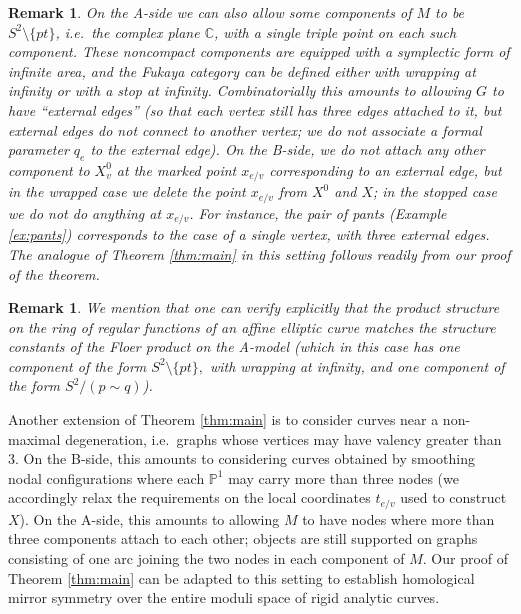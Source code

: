 \documentclass[11pt,leqno]{amsart}
\newtheorem{remark}[theo]{Remark}
\numberwithin{equation}{section}
\def\C{\mathbb{C}}
\def\PP{{\mathbb P}}
\begin{document}
\begin{remark}\label{rmk:opencase}
On the A-side we can also allow some components of $M$ to be $S^2\setminus
\{pt\}$, i.e.\ the complex plane $\C$, with a single triple point on each
such component. These noncompact components are equipped with a symplectic 
form of infinite area, and the Fukaya category can be defined either with wrapping at infinity or with a stop at infinity.
Combinatorially this amounts to allowing $G$ to have ``external
edges'' (so that each vertex still has three edges attached to it, but
external edges do not connect to another vertex; we do not associate
a formal parameter $q_e$ to the external edge). On the B-side, we do not
attach any other component to $X^0_v$ at the marked point $x_{e/v}$
corresponding to an external edge, but in the wrapped case we delete the point $x_{e/v}$ 
from $X^0$ and $X$; in the stopped case we do not do anything at $x_{e/v}$.
For instance, the pair of pants (Example \ref{ex:pants}) corresponds to
the case of a single vertex, with three external edges.
The analogue of Theorem \ref{thm:main} in this setting follows readily from
our proof of the theorem.
\end{remark}

\begin{remark}We mention that one can verify explicitly that the product structure on the ring of regular
functions of an affine elliptic curve matches the structure constants of
the Floer product on the A-model (which in this case has one component of the form $S^2\setminus\{pt\},$ with wrapping at infinity, and one component of the form $S^2/(p\sim q)$).\end{remark}

Another extension of Theorem \ref{thm:main} is to consider curves near
a non-maximal degeneration, i.e.\ graphs whose vertices may
have valency greater than 3. On the B-side, this amounts to considering
curves obtained by smoothing nodal configurations where each
$\PP^1$ may carry more than three nodes (we accordingly relax the requirements 
on the local coordinates $t_{e/v}$ used to construct $X$). On the A-side, 
this amounts to allowing $M$ to have nodes where more than three 
components attach to each other; objects are still supported on graphs
consisting of one arc joining the two nodes in each component of $M$.
Our proof of Theorem \ref{thm:main} can be adapted to this setting to
establish homological mirror symmetry over the entire moduli space of rigid analytic
curves.
\end{document}
